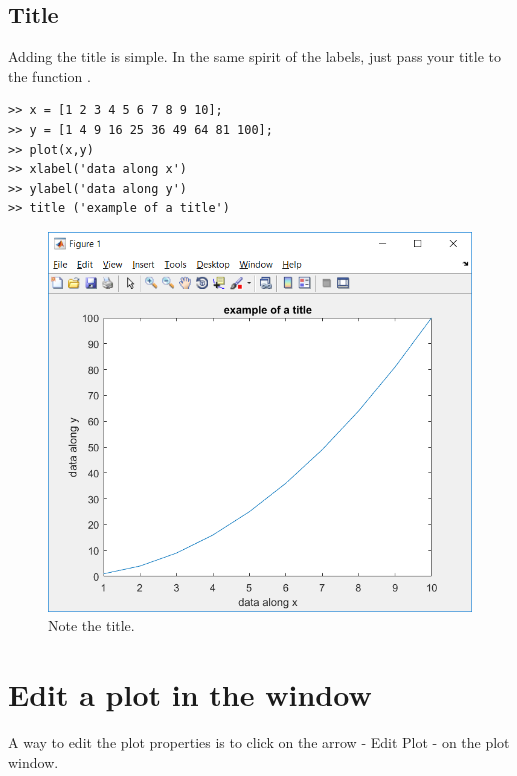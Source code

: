 	\subsection{Title}
		Adding the title is simple.
		In the same spirit of the labels, just pass your title to the function .
\begin{lstlisting}
>> x = [1 2 3 4 5 6 7 8 9 10];
>> y = [1 4 9 16 25 36 49 64 81 100];
>> plot(x,y)
>> xlabel('data along x')
>> ylabel('data along y')
>> title ('example of a title')
\end{lstlisting}
		\begin{figure}
			\center
			\includegraphics[height=0.43\linewidth]{./fig/plot_title.PNG}
			\caption{
				Note the title.
				}
			\label{fig-title}
		\end{figure}	
\section{Edit a plot in the window}
	A way to edit the plot properties is to click on the arrow - Edit Plot - on the plot window.

